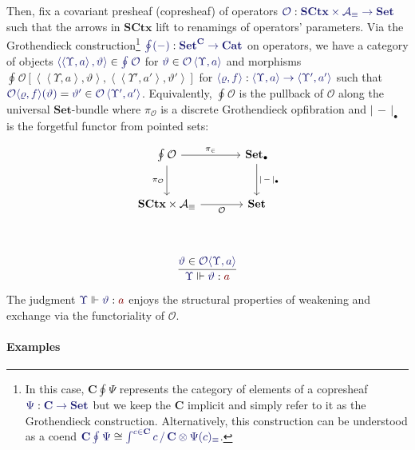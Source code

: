 \documentclass[11pt]{article}
\theoremstyle{definition}
\theoremstyle{remark}
\numberwithin{equation}{section}
\def\IModeColorName{MidnightBlue}
\def\OModeColorName{Maroon}
\newcommand\IMode[1]{{\color{\IModeColorName}{#1}}}
\newcommand\OMode[1]{{\color{\OModeColorName}{#1}}}
\newcommand\Member[2]{\IMode{#1}\in\IMode{#2}}
\newcommand\EqMember[3]{\IMode{#1}=\IMode{#2}\in\IMode{#3}}
\newcommand\Of[2]{\IMode{#1}: \IMode{#2}}
\newcommand\Arities{\mathcal{A}}
\newcommand\Operators{\mathcal{O}}
\newcommand\Cats{\mathbf{Cat}}
\newcommand\Discrete[1]{#1_{\equiv}}
\newcommand\Sets{\mathbf{Set}}
\newcommand\SCtx{\mathbf{SCtx}}
\newcommand\IsOperator[3]{\IMode{#1}\Vdash\IMode{#2}: \OMode{#3}}
\newcommand\Grothendieck[2]{\oint^{#1} #2#1}
\newcommand\Pair[2]{\left\langle#1, #2 \right\rangle}
\newcommand\FLift[2]{
  \Operators\langle#1%
  \ifthenelse{\equal{#2}{}}{}{, #2}\rangle%
}
\newcommand\SSingleton{\bullet}
\newcommand\Forget[1]{|\, #1\, |}
\newcommand\Coslice[2]{#1\, /\, #2}
\newcommand\Hom[3]{#1\left[#2,#3\right]}
\begin{document}
Then, fix a covariant presheaf (copresheaf) of operators
$\Of{\Operators}{\SCtx\times\Discrete{\Arities}\to\Sets}$ such that the arrows
in $\SCtx$ lift to renamings of operators' parameters. Via the Grothendieck
construction\footnote{In this case, $\mathbf{C}\Grothendieck{}{\Psi}$
  represents the category of elements of a copresheaf
  $\Of{\Psi}{\mathbf{C}\to\Sets}$ but we keep the $\mathbf{C}$ implicit and
  simply refer to it as the Grothendieck construction.  Alternatively, this
  construction can be understood as a coend
$\IMode{\mathbf{C}\Grothendieck{}{\Psi}}\cong \IMode{\int^{c \in
\mathbf{C}}\Coslice{c}{\mathbf{C}} \otimes \Discrete{\Psi(c)}}$.}
$\Of{\Grothendieck{}{(-)}}{\Sets^{\mathbf{C}}\to\Cats}$ on operators, we have a
category of objects
$\Member{\Pair{\Pair{\Upsilon}{a}}{\vartheta}}{\Grothendieck{}{\Operators}}$
for $\Member{\vartheta}{\Operators\Pair{\Upsilon}{a}}$ and morphisms
$\Hom{\Grothendieck{}{\Operators}}{\Pair{\Pair{\Upsilon}{a}}{\vartheta}}{\Pair{\Pair{\Upsilon'}{a'}}{\vartheta'}}$
for $\Of{\Pair{\varrho}{f}}{\Pair{\Upsilon}{a}\to\Pair{\Upsilon'}{a'}}$ such
that
$\EqMember{\FLift{\varrho}{f}(\vartheta)}{\vartheta'}{\Operators\Pair{\Upsilon'}{a'}}$.
Equivalently, $\Grothendieck{}{\Operators}$ is the pullback of $\Operators$
along the universal $\Sets$-bundle where $\pi_{\Operators}$ is a discrete
Grothendieck opfibration and $\Forget{-}_{\SSingleton}$ is the forgetful functor
from pointed sets:

\[
\begin{tikzcd}[ampersand replacement = \&, sep = large]
  {\Grothendieck{}{\Operators}}
    \arrow[r, "{\pi_{\in}}"]
    \arrow[d, "{\pi_{\Operators}}" left]
  \& {\Sets_{\SSingleton}}
    \arrow[d, "{\Forget{-}_{\SSingleton}}"] \\
  {\SCtx\times\Discrete{\Arities}}
     \arrow[r, "{\Operators}" below]
  \& {\Sets} \\
\end{tikzcd}
\]

\[
  \infer{
    \IsOperator{\Upsilon}{\vartheta}{a}
  }{
    \Member{\vartheta}{\Operators\langle\Upsilon,a\rangle}
  }
\]

The judgment $\IsOperator{\Upsilon}{\vartheta}{a}$ enjoys the structural
properties of weakening and exchange via the functoriality of
$\Operators$.

\paragraph{Examples}
\end{document}
